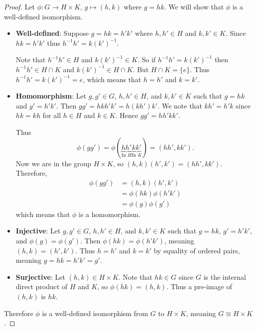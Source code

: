\newpage

\begin{proof}
    Let $\phi: G \to H \times K$, $g \mapsto (h, k)$ where $g = hk$. We will show that $\phi$ is a well-defined isomorphism.
    \begin{itemize}
        \item \textbf{Well-defined}: Suppose $g = hk = h'k'$ where $h, h' \in H$ and $k, k' \in K$. Since $hk = h'k'$ thus $h^{-1}h' = k(k')^{-1}$.

        Note that $h^{-1}h' \in H$ and $k(k')^{-1} \in K$. So if $h^{-1}h' = k(k')^{-1}$ then $h^{-1}h' \in H \cap K$ and $k(k')^{-1} \in H \cap K$. But $H \cap K = \{e\}$. Thus $h^{-1}h' = k(k')^{-1} = e$, which means that $h = h'$ and $k = k'$.
        
        \item \textbf{Homomorphism}: Let $g, g' \in G$, $h, h' \in H$, and $k, k' \in K$ such that $g = hk$ and $g' = h'k'$. Then $gg' = hkh'k' = h(kh')k'$. We note that $kh' = h'k$ since $hk = kh$ for all $h \in H$ and $k \in K$. Hence $gg' = hh'kk'$.
        
        Thus
        \[
            \phi(gg') = \phi(\underbrace{hh'}_{\text{In }H}\underbrace{kk'}_{\text{In }K}) = (hh', kk').
        \]
        Now we are in the group $H \times K$, so $(h, k)(h', k') = (hh', kk')$. Therefore,
        \begin{align*}
            \phi(gg') &= (h,k)(h',k')\\
            &= \phi(hk)\phi(h'k')\\
            &= \phi(g)\phi(g')
        \end{align*}
        which means that $\phi$ is a homomorphism.
        
        \item \textbf{Injective}: Let $g, g' \in G$, $h, h' \in H$, and $k, k' \in K$ such that $g = hk$, $g' = h'k'$, and $\phi(g) = \phi(g')$. Then $\phi(hk) = \phi(h'k')$, meaning $(h,k) = (h',k')$. Thus $h = h'$ and $k = k'$ by equality of ordered pairs, meaning $g = hk = h'k' = g'$.
        
        \item \textbf{Surjective}: Let $(h, k) \in H \times K$. Note that $hk \in G$ since $G$ is the internal direct product of $H$ and $K$, so $\phi(hk) = (h, k)$. Thus a pre-image of $(h, k)$ is $hk$.
    \end{itemize}
    Therefore $\phi$ is a well-defined isomorphism from $G$ to $H \times K$, meaning $G \cong H \times K$.
\end{proof}

